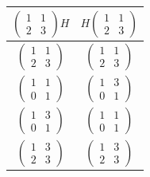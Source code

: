 \documentclass[11pt, fleqn]{article}
\begin{document}
\begin{enumerate}
\begin{tabular}{c|c}
        $\begin{pmatrix}
            1 & 1\\
            2 & 3
        \end{pmatrix} H$ & $H \begin{pmatrix}
            1 & 1\\
            2 & 3
        \end{pmatrix}$\\
        \hline
        $\begin{pmatrix}
            1 & 1\\
            2 & 3
        \end{pmatrix}$ & $\begin{pmatrix}
            1 & 1\\
            2 & 3
        \end{pmatrix}$\\
        $\begin{pmatrix}
            1 & 1\\
            0 & 1
        \end{pmatrix}$ & $\begin{pmatrix}
            1 & 3\\
            0 & 1
        \end{pmatrix}$\\
        $\begin{pmatrix}
            1 & 3\\
            0 & 1
        \end{pmatrix}$ & $\begin{pmatrix}
            1 & 1\\
            0 & 1
        \end{pmatrix}$\\
        $\begin{pmatrix}
            1 & 3\\
            2 & 3
        \end{pmatrix}$ & $\begin{pmatrix}
            1 & 3\\
            2 & 3
        \end{pmatrix}$
      \end{tabular}
\end{enumerate}
\end{document}
